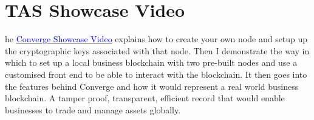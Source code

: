 \let\textcircled=\pgftextcircled
\chapter{TAS Showcase Video}

he \href{run:./Video/Converge_Showcase.mp4}{\textcolor{blue}{Converge Showcase Video}} explains how to create your own node and setup up the cryptographic keys associated with that node. Then I demonstrate the way in which to set up a local business blockchain with two pre-built nodes and use a customised front end to be able to interact with the blockchain. It then goes into the features behind Converge and how it would represent a real world business blockchain. A tamper proof, transparent, efficient record that would enable businesses to trade and manage assets globally.
